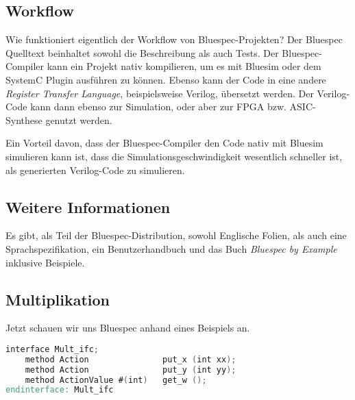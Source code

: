 \documentclass[ngerman]{scrartcl}
\begin{document}
\subsection{Workflow}

Wie funktioniert eigentlich der Workflow von Bluespec-Projekten? Der Bluespec Quelltext beinhaltet sowohl die Beschreibung als auch Tests. Der Bluespec-Compiler kann ein Projekt nativ kompilieren, um es mit Bluesim oder dem SystemC Plugin ausführen zu können. Ebenso kann der Code in eine andere \emph{Register Transfer Language}, beispielsweise Verilog, übersetzt werden. Der Verilog-Code kann dann ebenso zur Simulation, oder aber zur FPGA bzw. ASIC-Synthese genutzt werden. 

Ein Vorteil davon, dass der Bluespec-Compiler den Code nativ mit Bluesim simulieren kann ist, dass die Simulationsgeschwindigkeit wesentlich schneller ist, als generierten Verilog-Code zu simulieren. 


\subsection{Weitere Informationen}

Es gibt, als Teil der Bluespec-Distribution, sowohl Englische Folien, als auch eine Sprachspezifikation, ein Benutzerhandbuch und das Buch \emph{Bluespec by Example} inklusive Beispiele.

\subsection{Multiplikation}

Jetzt schauen wir uns Bluespec anhand eines Beispiels an.

\begin{lstlisting}[language=verilog]
interface Mult_ifc;
    method Action               put_x (int xx);
    method Action               put_y (int yy);
    method ActionValue #(int)   get_w ();
endinterface: Mult_ifc
\end{lstlisting}
\end{document}
